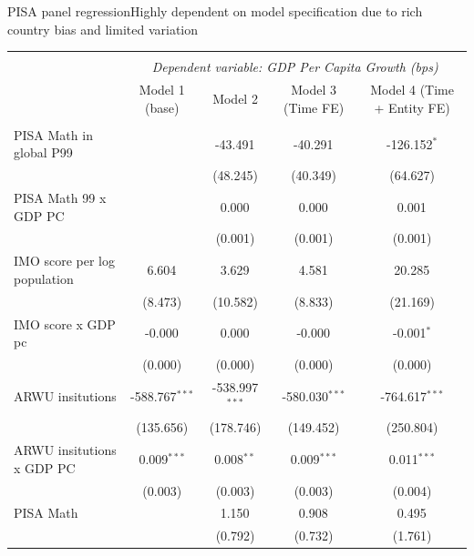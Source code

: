\documentclass[10pt]{beamer}
\begin{document}
\begin{frame}{PISA panel regression}{Highly dependent on model specification due to rich country bias and limited variation}
    \begin{table}[!htbp] \centering
        \resizebox{\linewidth}{!} {
            \begin{tabular}{@{\extracolsep{5pt}}lcccc}
                \\[-1.8ex]\hline
                \hline \\[-1.8ex]
                & \multicolumn{4}{c}{\textit{Dependent variable: GDP Per Capita Growth (bps)}} \
                \cr \cline{2-5}
                \\[-1.8ex] & \multicolumn{1}{c}{Model 1 (base)} & \multicolumn{1}{c}{Model 2} & \multicolumn{1}{c}{Model 3 (Time FE)} & \multicolumn{1}{c}{Model 4 (Time + Entity FE)}  \\
                \hline \\[-1.8ex]
                 PISA Math in global P99 & & -43.491$^{}$ & -40.291$^{}$ & -126.152$^{*}$ \\
                & & (48.245) & (40.349) & (64.627) \\
                 PISA Math 99 x GDP PC & & 0.000$^{}$ & 0.000$^{}$ & 0.001$^{}$ \\
                & & (0.001) & (0.001) & (0.001) \\
                 IMO score per log population & 6.604$^{}$ & 3.629$^{}$ & 4.581$^{}$ & 20.285$^{}$ \\
                & (8.473) & (10.582) & (8.833) & (21.169) \\
                 IMO score x GDP pc & -0.000$^{}$ & 0.000$^{}$ & -0.000$^{}$ & -0.001$^{*}$ \\
                & (0.000) & (0.000) & (0.000) & (0.000) \\
                 ARWU insitutions & -588.767$^{***}$ & -538.997$^{***}$ & -580.030$^{***}$ & -764.617$^{***}$ \\
                & (135.656) & (178.746) & (149.452) & (250.804) \\
                 ARWU insitutions x GDP PC & 0.009$^{***}$ & 0.008$^{**}$ & 0.009$^{***}$ & 0.011$^{***}$ \\
                & (0.003) & (0.003) & (0.003) & (0.004) \\
                 PISA Math & & 1.150$^{}$ & 0.908$^{}$ & 0.495$^{}$ \\
                & & (0.792) & (0.732) & (1.761) \\

\end{tabular}}
\end{table}
\end{frame}
\end{document}
